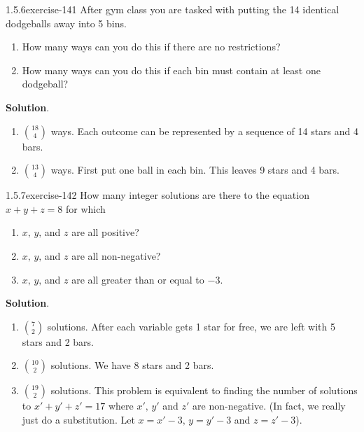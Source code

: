 \documentclass[twoside,11pt,]{book}
\numberwithin{equation}{chapter}
\begin{document}
\begin{divisionsolution}{1.5.6}{}{exercise-141}%
\hypertarget{p-2316}{}%
After gym class you are tasked with putting the 14 identical dodgeballs away into 5 bins.\leavevmode%
\begin{enumerate}[label=(\alph*)]
\item\hypertarget{li-1425}{}\hypertarget{p-2317}{}%
How many ways can you do this if there are no restrictions?%
\item\hypertarget{li-1426}{}\hypertarget{p-2319}{}%
How many ways can you do this if each bin must contain at least one dodgeball?%
\end{enumerate}
%
\par\smallskip%
\noindent\textbf{Solution}.\quad%
\hypertarget{p-2321}{}%
\leavevmode%
\begin{enumerate}[label=(\alph*)]
\item\hypertarget{li-1427}{}\hypertarget{p-2322}{}%
\({18 \choose 4}\) ways. Each outcome can be represented by a sequence of 14 stars and 4 bars.%
\item\hypertarget{li-1428}{}\hypertarget{p-2323}{}%
\({13 \choose 4}\) ways. First put one ball in each bin. This leaves 9 stars and 4 bars.%
\end{enumerate}
%
\end{divisionsolution}%
\begin{divisionsolution}{1.5.7}{}{exercise-142}%
\hypertarget{p-2335}{}%
How many integer solutions are there to the equation \(x + y + z = 8\) for which\leavevmode%
\begin{enumerate}[label=(\alph*)]
\item\hypertarget{li-1435}{}\hypertarget{p-2336}{}%
\(x\text{,}\) \(y\text{,}\) and \(z\) are all positive?%
\item\hypertarget{li-1436}{}\hypertarget{p-2338}{}%
\(x\text{,}\) \(y\text{,}\) and \(z\) are all non-negative?%
\item\hypertarget{li-1437}{}\hypertarget{p-2340}{}%
\(x\text{,}\) \(y\text{,}\) and \(z\) are all greater than or equal to \(-3\text{.}\)%
\end{enumerate}
%
\par\smallskip%
\noindent\textbf{Solution}.\quad%
\hypertarget{p-2342}{}%
\leavevmode%
\begin{enumerate}[label=(\alph*)]
\item\hypertarget{li-1438}{}\hypertarget{p-2343}{}%
\({7 \choose 2}\) solutions. After each variable gets 1 star for free, we are left with 5 stars and 2 bars.%
\item\hypertarget{li-1439}{}\hypertarget{p-2344}{}%
\({10 \choose 2}\) solutions. We have 8 stars and 2 bars.%
\item\hypertarget{li-1440}{}\hypertarget{p-2345}{}%
\({19 \choose 2}\) solutions. This problem is equivalent to finding the number of solutions to \(x' + y' + z' = 17\) where \(x'\text{,}\) \(y'\) and \(z'\) are non-negative. (In fact, we really just do a substitution. Let \(x = x'- 3\text{,}\) \(y = y' - 3\) and \(z = z' - 3\)).%
\end{enumerate}
%
\end{divisionsolution}%
\end{document}
